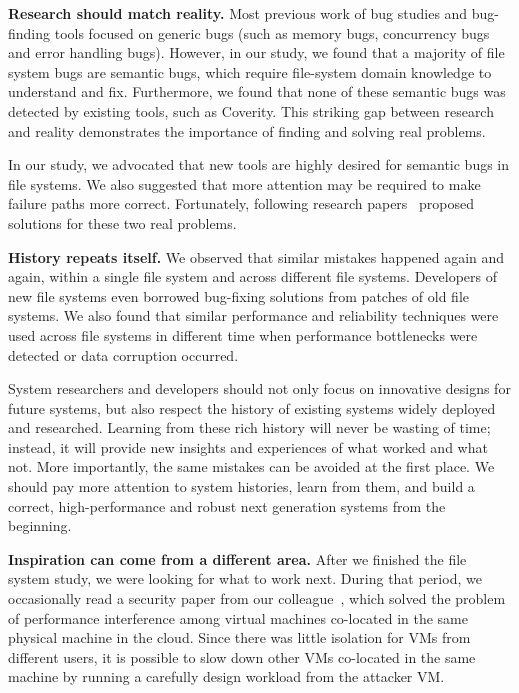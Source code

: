 \vspace{0.1in} \noindent \textbf{Research should match reality.}
Most previous work of bug studies and bug-finding tools focused on
generic bugs (such as memory bugs, concurrency bugs and error handling
bugs). However, in our study, we found that a majority of file system
bugs are semantic bugs, which require file-system domain knowledge to 
understand and fix.  Furthermore, we found that none of these semantic
bugs was detected by existing tools, such as Coverity.  This striking
gap between research and reality demonstrates the importance of
finding and solving real problems. 

In our study, we advocated that new tools are highly desired for
semantic bugs in file systems. We also suggested that more attention
may be required to make failure paths more correct.  Fortunately,
following research papers~\cite{MinEtAl15-SOSP,YuanEtAl14-OSDI}
proposed solutions for these two real problems. 


\vspace{0.1in} \noindent \textbf{History repeats itself.} 
We observed that similar mistakes happened again and again, within a
single file system and across different file systems. Developers of
new file systems even borrowed bug-fixing solutions from patches of
old file systems. We also found that similar performance and
reliability techniques were used across file systems in
different time when performance bottlenecks were detected or data
corruption occurred. 

System researchers and developers should not only focus on innovative
designs for future systems, but also respect the history of existing
systems widely deployed and researched. Learning from these rich
history will never be wasting of time; instead, it will provide new
insights and experiences of what worked and what not. More
importantly, the same mistakes can be avoided at the first place. 
We should pay more attention to system histories, learn from them, and
build a correct, high-performance and robust next generation systems
from the beginning. 

\vspace{0.1in} \noindent \textbf{Inspiration can come from a different area.}
After we finished the file system study, we were looking for what to
work next.  During that period, we occasionally read a security paper
from our colleague~\cite{VaraEtAl12-CCS}, which solved the problem of 
performance interference among virtual machines co-located in the same
physical machine in the cloud.  Since there was little isolation
for VMs from different users, it is possible to slow down other VMs
co-located in the same machine by running a carefully design workload
from the attacker VM. 

